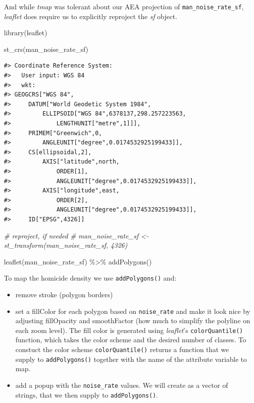 \documentclass[
  11pt,
]{book}
\newenvironment{Shaded}{\begin{snugshade}}{\end{snugshade}}
\newcommand{\CommentTok}[1]{\textcolor[rgb]{0.56,0.35,0.01}{\textit{#1}}}
\newcommand{\FunctionTok}[1]{\textcolor[rgb]{0.00,0.00,0.00}{#1}}
\newcommand{\NormalTok}[1]{#1}
\newcommand{\SpecialCharTok}[1]{\textcolor[rgb]{0.00,0.00,0.00}{#1}}
\providecommand{\tightlist}{%
  \setlength{\itemsep}{0pt}\setlength{\parskip}{0pt}}
\begin{document}
And while \emph{tmap} was tolerant about our AEA projection of \texttt{man\_noise\_rate\_sf}, \emph{leaflet} does require us to explicitly reproject the \emph{sf} object.

\begin{Shaded}
\begin{Highlighting}[]
\FunctionTok{library}\NormalTok{(leaflet) }

\FunctionTok{st\_crs}\NormalTok{(man\_noise\_rate\_sf)}
\end{Highlighting}
\end{Shaded}

\begin{verbatim}
#> Coordinate Reference System:
#>   User input: WGS 84 
#>   wkt:
#> GEOGCRS["WGS 84",
#>     DATUM["World Geodetic System 1984",
#>         ELLIPSOID["WGS 84",6378137,298.257223563,
#>             LENGTHUNIT["metre",1]]],
#>     PRIMEM["Greenwich",0,
#>         ANGLEUNIT["degree",0.0174532925199433]],
#>     CS[ellipsoidal,2],
#>         AXIS["latitude",north,
#>             ORDER[1],
#>             ANGLEUNIT["degree",0.0174532925199433]],
#>         AXIS["longitude",east,
#>             ORDER[2],
#>             ANGLEUNIT["degree",0.0174532925199433]],
#>     ID["EPSG",4326]]
\end{verbatim}

\begin{Shaded}
\begin{Highlighting}[]
\CommentTok{\# reproject, if needed}
\CommentTok{\# man\_noise\_rate\_sf \textless{}{-} st\_transform(man\_noise\_rate\_sf, 4326)}

\FunctionTok{leaflet}\NormalTok{(man\_noise\_rate\_sf) }\SpecialCharTok{\%\textgreater{}\%}
  \FunctionTok{addPolygons}\NormalTok{()}
\end{Highlighting}
\end{Shaded}

To map the homicide density we use \texttt{addPolygons()} and:

\begin{itemize}
\tightlist
\item
  remove stroke (polygon borders)\\
\item
  set a fillColor for each polygon based on \texttt{noise\_rate} and make it look nice by adjusting fillOpacity and smoothFactor (how much to simplify the polyline on each zoom level). The fill color is generated using \emph{leaflet}'s \texttt{colorQuantile()} function, which takes the color scheme and the desired number of classes. To constuct the color scheme \texttt{colorQuantile()} returns a function that we supply to \texttt{addPolygons()} together with the name of the attribute variable to map.\\
\item
  add a popup with the \texttt{noise\_rate} values. We will create as a vector of strings, that we then supply to \texttt{addPolygons()}.
\end{itemize}
\end{document}
